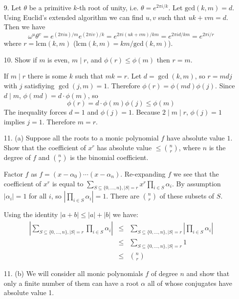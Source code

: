 \documentclass{article}
\newcommand{\w}[0]{\omega}
\begin{document}
\begin{enumerate}
\item[9.] Let $\theta$ be a primitive $k$-th root of unity, i.e. $\theta = e^{2\pi i / k}$.  Let $\text{gcd}(k, m) = d$.  Using Euclid's extended algorithm we can find $u, v$ such that $uk + vm = d$.  Then we have
\[ \w^u \theta^v = e^{(2\pi i u)/m} e^{(2\pi i v) / k} = e^{2\pi i (uk + vm) / km} = e^{2\pi i d / km} = e^{2\pi i / r} \]
where $r = \text{lcm}(k, m)$ ($\text{lcm}(k, m) = km / \text{gcd}(k, m)$).

\item[10.] Show if $m$ is even, $m \mid r$, and $\phi(r) \le \phi(m)$ then $r = m$.

If $m \mid r$ there is some $k$ such that $mk = r$.  Let $d = \gcd(k, m)$, so $r = mdj$ with $j$ satisfiying $\gcd(j, m) = 1$.  Therefore $\phi(r) = \phi(md)\phi(j)$.  Since $d \mid m$, $\phi(md) = d \cdot \phi(m)$, so \[ \phi(r) = d \cdot \phi(m)\phi(j) \le \phi(m) \]  The inequality forces $d = 1$ and $\phi(j) = 1$.  Because $2 \mid m \mid r$, $\phi(j) = 1$ implies $j = 1$.  Therefore $m = r$.

\item[11. (a)] Suppose all the roots to a monic polynomial $f$ have absolute value $1$.  Show that the coefficient of $x^r$ has absolute value $\le \binom{n}{r}$, where $n$ is the degree of $f$ and $\binom{n}{r}$ is the binomial coefficient.

Factor $f$ as $f = (x - \alpha_0) \cdots (x - \alpha_n)$.  Re-expanding $f$ we see that the coefficient of $x^r$ is equal to $\sum_{S \subseteq \{0, \ldots, n\}, |S| = r} x^r \prod_{i \in S} \alpha_i$.  By assumption $|\alpha_i| = 1$ for all $i$, so $|\prod_{i \in S} \alpha_i| = 1$.  There are $\binom{n}{r}$ of these subsets of $S$.

Using the identity $|a + b| \le |a| + |b|$ we have:
\begin{eqnarray*}
    \left|\sum_{S \subseteq \{0, \ldots, n\}, |S| = r} \prod_{i \in S} \alpha_i \right| &\le& \sum_{S \subseteq \{0, \ldots, n\}, |S| = r} | \prod_{i \in S} \alpha_i | \\
    &\le& \sum_{S \subseteq \{0, \ldots, n\}, |S| = r} 1 \\
    &\le& \binom{n}{r}
\end{eqnarray*}

\item[11. (b)] We will consider all monic polynomials $f$ of degree $n$ and show that only a finite number of them can have a root $\alpha$ all of whose conjugates have absolute value 1.


\end{enumerate}
\end{document}
